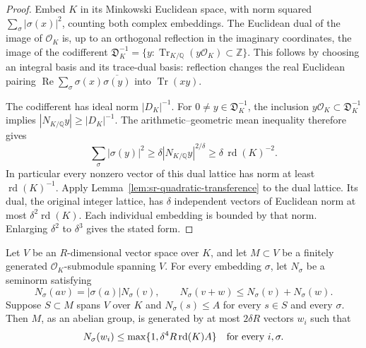 \begin{proof}
Embed \(K\) in its Minkowski Euclidean space, with norm squared
\(\sum_\sigma|\sigma(x)|^2\), counting both complex embeddings.
The Euclidean dual of the image of \(\mathcal O_K\) is, up to an
orthogonal reflection in the imaginary coordinates, the image of the
codifferent
\(\mathfrak D_K^{-1}=\{y:\operatorname{Tr}_{K/\mathbb Q}
(y\mathcal O_K)\subset\mathbb Z\}\).
This follows by choosing an integral basis and its trace-dual basis:
reflection changes the real Euclidean pairing
\(\operatorname{Re}\sum_\sigma\sigma(x)\overline{\sigma(y)}\)
into \(\operatorname{Tr}(xy)\).

The codifferent has ideal norm \(|D_K|^{-1}\).
For \(0\ne y\in\mathfrak D_K^{-1}\), the inclusion
\(y\mathcal O_K\subset\mathfrak D_K^{-1}\) implies
\(|N_{K/\mathbb Q}y|\ge |D_K|^{-1}\).
The arithmetic--geometric mean inequality therefore gives
\[
 \sum_\sigma|\sigma(y)|^2
 \ge \delta |N_{K/\mathbb Q}y|^{2/\delta}
 \ge \delta\,\operatorname{rd}(K)^{-2}.
\]
In particular every nonzero vector of this dual lattice has norm at
least \(\operatorname{rd}(K)^{-1}\).
Apply Lemma~\ref{lem:sr-quadratic-transference} to the dual lattice.
Its dual, the original integer lattice, has \(\delta\) independent
vectors of Euclidean norm at most
\(\delta^2\operatorname{rd}(K)\).
Each individual embedding is bounded by that norm.
Enlarging \(\delta^2\) to \(\delta^3\) gives the stated form.
\end{proof}

\begin{srproposition}
\label{prop:sr-short-integral-generators}
Let \(V\) be an \(R\)-dimensional vector space over \(K\), and let
\(M\subset V\) be a finitely generated \(\mathcal O_K\)-submodule
spanning \(V\).  For every embedding \(\sigma\), let \(N_\sigma\) be
a seminorm satisfying
\[
 N_\sigma(av)=|\sigma(a)|N_\sigma(v),\qquad
 N_\sigma(v+w)\le N_\sigma(v)+N_\sigma(w).
\]
Suppose \(S\subset M\) spans \(V\) over \(K\) and
\(N_\sigma(s)\le A\) for every \(s\in S\) and every \(\sigma\).
Then \(M\), as an abelian group, is generated by at most \(2\delta R\)
vectors \(w_i\) such that
\begin{equation}\label{eq:sr-generator-bound}
 N_\sigma(w_i)\le
 \max\{1,\delta^4R\operatorname{rd}(K)A\}
 \quad\hbox{for every }i,\sigma.
\end{equation}
\end{srproposition}

